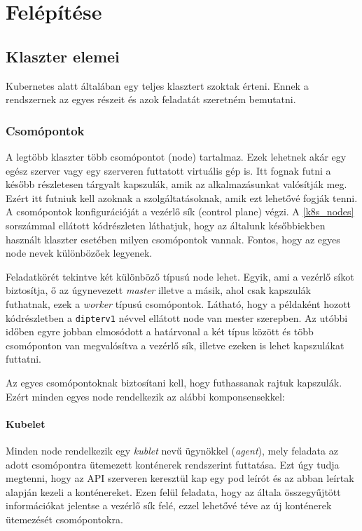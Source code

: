 \section{Felépítése}

\subsection{Klaszter elemei}
Kubernetes alatt általában egy teljes klasztert szoktak érteni. Ennek a rendszernek az egyes részeit és azok feladatát szeretném bemutatni.  

\subsubsection{Csomópontok}
A legtöbb klaszter több csomópontot (node) tartalmaz. Ezek lehetnek akár egy egész szerver vagy egy szerveren futtatott virtuális gép is. Itt fognak futni a később részletesen tárgyalt kapszulák, amik az alkalmazásunkat valósítják meg. Ezért itt futniuk kell azoknak a szolgáltatásoknak, amik ezt lehetővé fogják tenni. A csomópontok konfigurációját a vezérlő sík (control plane) végzi. A \ref{k8s_nodes} sorszámmal ellátott kódrészleten láthatjuk, hogy az általunk későbbiekben használt klaszter esetében milyen csomópontok vannak. Fontos, hogy az egyes node nevek  különbözőek legyenek. 

Feladatkörét tekintve két különböző típusú node lehet. Egyik, ami a vezérlő síkot biztosítja, ő az úgynevezett \textit{master} illetve a másik, ahol csak kapszulák futhatnak, ezek a \textit{worker} típusú csomópontok. Látható, hogy a példaként hozott kódrészletben a \verb+dipterv1+ névvel ellátott node van mester szerepben. Az utóbbi időben egyre jobban elmosódott a határvonal a két típus között és több csomóponton van megvalósítva a vezérlő sík, illetve ezeken is lehet kapszulákat futtatni.

\lstset{caption=Később használt klaszter csomópontjai, label=k8s_nodes}


Az egyes csomópontoknak biztosítani kell, hogy futhassanak rajtuk kapszulák. Ezért minden egyes node rendelkezik az alábbi komponsensekkel:

\paragraph{Kubelet} Minden node rendelkezik egy \textit{kublet} nevű ügynökkel (\textit{agent}), mely feladata az adott csomópontra ütemezett konténerek rendszerint futtatása. Ezt úgy tudja megtenni, hogy az API szerveren keresztül kap egy pod leírót és az abban leírtak alapján kezeli a konténereket. Ezen felül feladata, hogy az általa összegyűjtött információkat jelentse a vezérlő sík felé, ezzel lehetővé téve az új konténerek ütemezését csomópontokra. 

